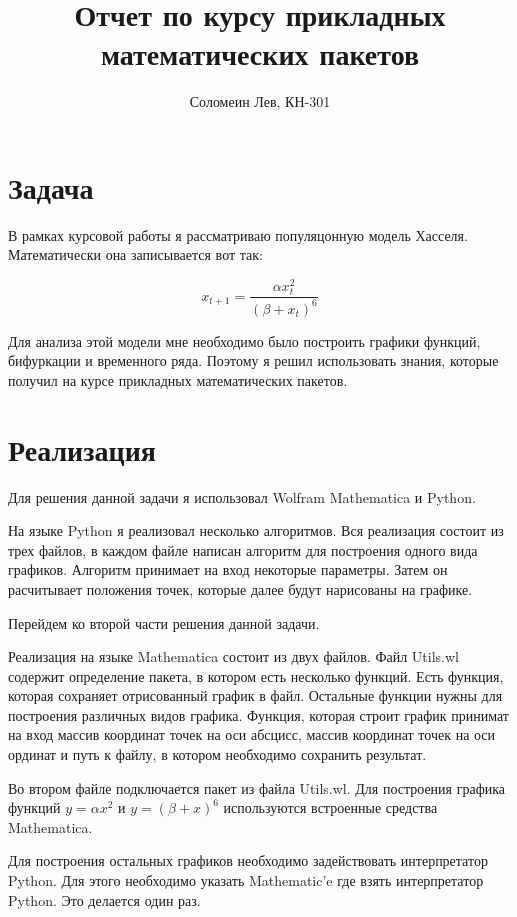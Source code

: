 \documentclass[14pt]{extarticle}
\title{Отчет по курсу прикладных математических пакетов}
\author{Соломеин Лев, КН-301}
\begin{document}
    \maketitle

    \clearpage

    \section*{Задача}

        В рамках курсовой работы я рассматриваю популяцонную модель Хасселя. Математически она записывается вот так:
        
        \[x_{t+1} = \frac{\alpha x_t^2}{(\beta + x_t)^6}\]

        Для анализа этой модели мне необходимо было построить графики функций, бифуркации и временного ряда. Поэтому я решил использовать знания, которые получил на курсе прикладных математических пакетов.

    \section*{Реализация}

        Для решения данной задачи я использовал Wolfram Mathematica и Python. 
        
        На языке Python я реализовал несколько алгоритмов. Вся реализация состоит из трех файлов, в каждом файле написан алгоритм для построения одного вида графиков. Алгоритм принимает на вход некоторые параметры. Затем он расчитывает положения точек, которые далее будут нарисованы на графике.

        Перейдем ко второй части решения данной задачи. 

        Реализация на языке Mathematica состоит из двух файлов. Файл Utils.wl содержит определение пакета, в котором есть несколько функций. Есть функция, которая сохраняет отрисованный график в файл. Остальные функции нужны для построения различных видов графика. Функция, которая строит график принимат на вход массив координат точек на оси абсцисс, массив координат точек на оси ординат и путь к файлу, в котором необходимо сохранить результат.

        Во втором файле подключается пакет из файла Utils.wl. Для построения графика функций \(y = \alpha x^2\) и \(y = (\beta + x)^6\) используются встроенные средства Mathematica. 
        
        Для построения остальных графиков необходимо задействовать интерпретатор Python. Для этого необходимо указать Mathematic'e где взять интерпретатор Python. Это делается один раз. 
        
\end{document}
